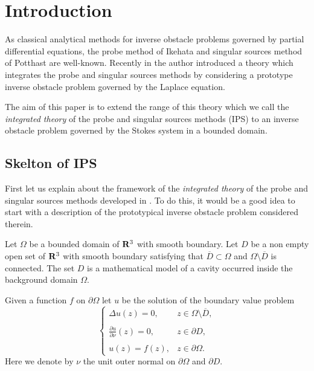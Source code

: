 





\section{Introduction}


As classical analytical methods for inverse obstacle problems governed by partial differential equations, the probe method of Ikehata \cite{IProbe} and singular sources method of Potthast \cite{P1} are well-known.
Recently in \cite{IPS}  the author introduced a theory which integrates
the probe and singular sources methods by considering a prototype inverse obstacle problem
governed by the Laplace equation.

The aim of this paper is to extend the range of this theory which we call the {\it integrated theory} of 
the probe and singular sources methods (IPS)
to an inverse obstacle problem governed by the Stokes system in a bounded domain.




\subsection{Skelton of IPS}




First let us explain about the framework of the {\it integrated theory} of the probe and singular sources methods
developed in \cite{IPS}.
To do this, it would be a good idea to start with a description of the prototypical inverse obstacle problem considered therein.




Let $\Omega$ be a bounded domain of $\Bbb R^3$ with smooth boundary.
Let $D$ be a non empty open set of $\Bbb R^3$ with smooth boundary satisfying that
$\overline{D}\subset\Omega$
and $\Omega\setminus\overline{D}$ is connected.   The set $D$ is a mathematical model of  a cavity occurred
inside the background domain $\Omega$.

Given a function $f$ on $\partial\Omega$ let $u$ be the solution
of the boundary value problem
$$
\left\{
\begin{array}{ll}
\displaystyle
\Delta u(z)=0, & z\in\Omega\setminus\overline{D},
\\
\\
\displaystyle
\frac{\partial u}{\partial\nu}(z)=0, & z\in\partial D,
\\
\\
\displaystyle
u(z)=f(z), & z\in\partial\Omega.
\end{array}
\right.
$$
Here we denote by $\nu$ the unit outer normal on $\partial\Omega$ and $\partial D$.


